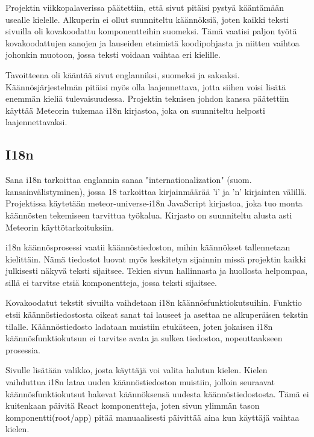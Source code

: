 

Projektin viikkopalaverissa päätettiin, että sivut pitäisi pystyä kääntämään usealle kielelle.
Alkuperin ei ollut suunniteltu käännöksiä, joten kaikki teksti sivuilla oli kovakoodattu komponentteihin suomeksi. 
Tämä vaatisi paljon työtä kovakoodattujen sanojen ja lauseiden etsimistä koodipohjasta ja niitten vaihtoa johonkin muotoon, jossa teksti voidaan vaihtaa eri kielille.
\medskip

Tavoitteena oli kääntää sivut englanniksi, suomeksi ja saksaksi. Käännösjärjestelmän pitäisi myös olla laajennettava, jotta siihen voisi lisätä enemmän kieliä tulevaisuudessa.
Projektin teknisen johdon kanssa päätettiin käyttää Meteorin tukemaa i18n kirjastoa, joka on suunniteltu helposti laajennettavaksi.
\medskip







\subsection*{I18n}


Sana i18n tarkoittaa englannin sanaa "internationalization"{} (suom. kansainvälistyminen), jossa 18 tarkoittaa kirjainmäärää 'i' ja 'n' kirjainten välillä. Projektissa käytetään meteor-universe-i18n JavaScript kirjastoa, joka tuo monta käännösten tekemiseen tarvittua työkalua.
Kirjasto on suunniteltu alusta asti Meteorin käyttötarkoituksiin.\medskip

i18n käännösprosessi vaatii käännöstiedoston, mihin käännökset tallennetaan kielittäin.
Nämä tiedostot luovat myös keskitetyn sijainnin missä projektin kaikki julkisesti näkyvä teksti sijaitsee. Tekien sivun hallinnasta ja huollosta helpompaa, sillä ei tarvitse etsiä komponentteja, jossa teksti sijaitsee. 
\medskip

Kovakoodatut tekstit sivuilta vaihdetaan i18n käännösfunktiokutsuihin. Funktio etsii käännöstiedostosta oikeat sanat tai lauseet ja asettaa ne alkuperäisen tekstin tilalle. 
Käännöstiedosto ladataan muistiin etukäteen, joten jokaisen i18n käännösfunktiokutsun ei tarvitse avata ja sulkea tiedostoa, nopeuttaakseen prosessia.\medskip

Sivulle lisätään valikko, josta käyttäjä voi valita halutun kielen. Kielen vaihduttua i18n lataa uuden käännöstiedoston muistiin, jolloin seuraavat käännösfunktiokutsut hakevat käännöksensä uudesta käännöstiedostosta.
Tämä ei kuitenkaan päivitä React komponentteja, joten sivun ylimmän tason komponentti(root/app) pitää manuaalisesti päivittää aina kun käyttäjä vaihtaa kielen.\medskip




